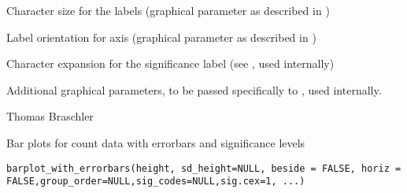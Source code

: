 \documentclass[a4paper]{book}
\begin{document}
\begin{Arguments}
\begin{ldescription}
\item[\code{cex.lab}] 
Character size for the labels (graphical parameter as described in )

\item[\code{las}] 
Label orientation for axis (graphical parameter as described in )

\item[\code{sig.cex}] 
Character expansion for the significance label (see , used internally)





\item[\code{...}] 
Additional graphical parameters, to be passed specifically to , used internally.

\end{ldescription}
\end{Arguments}
%
\begin{Author}\relax
Thomas Braschler
\end{Author}
%
\begin{Description}\relax
Bar plots for count data with errorbars and significance levels
\end{Description}
%
\begin{Usage}
\begin{verbatim}
barplot_with_errorbars(height, sd_height=NULL, beside = FALSE, horiz = FALSE,group_order=NULL,sig_codes=NULL,sig.cex=1, ...)
\end{verbatim}
\end{Usage}
%
\end{document}
